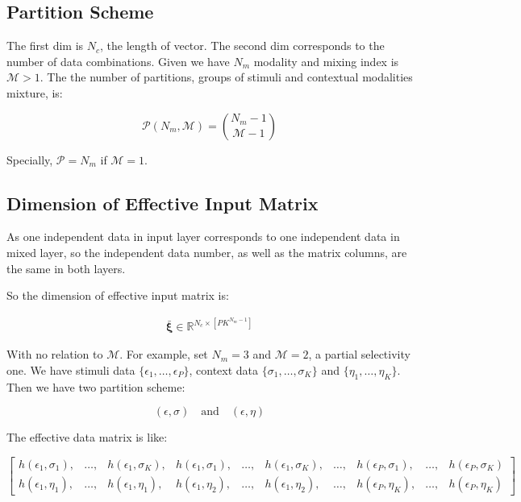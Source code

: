 \documentclass[conference]{acmsiggraph}
\begin{document}
\subsection{Partition Scheme}

The first dim is $N_c$, the length of vector. The second dim corresponds to the number of data combinations. Given we have $N_m$ modality and mixing index is $\mathcal{M} > 1$. The the number of partitions, groups of stimuli and contextual modalities mixture, is:

\begin{equation}
    \mathcal{P}(N_m,\mathcal{M}) = {N_m-1 \choose \mathcal{M}-1}
\end{equation}

Specially, $\mathcal{P} = N_m$ if $\mathcal{M} = 1$. 


\subsection{Dimension of Effective Input Matrix}

As one independent data in input layer corresponds to one independent data in mixed layer, so the independent data number, as well as the matrix columns, are the same in both layers. 

So the dimension of effective input matrix is:

\begin{align}
    \bar{\mathbf{\xi}} \in \mathbb{R}^{{N_c} \times [PK^{N_m - 1}]}
\end{align}

With no relation to $\mathcal{M}$. For example, set $N_m = 3$ and $\mathcal{M} = 2$, a partial selectivity one. We have stimuli data $\{\epsilon_1,\dots,\epsilon_P\}$, context data $\{\sigma_1,\dots,\sigma_K\}$ and $\{\eta_1,\dots,\eta_K\}$. Then we have two partition scheme:

\begin{equation*}
    (\epsilon,\sigma) \quad \text{and} \quad (\epsilon,\eta)
\end{equation*}

The effective data matrix is like:

\begin{equation}
\begin{bmatrix}
h(\epsilon_1,\sigma_1), & \dots, & h(\epsilon_1,\sigma_K), & h(\epsilon_1,\sigma_1), & \dots, & h(\epsilon_1,\sigma_K), & \dots, & h(\epsilon_P,\sigma_1), & \dots, & h(\epsilon_P,\sigma_K) \\
h(\epsilon_1,\eta_1), & \dots, & h(\epsilon_1,\eta_1), & h(\epsilon_1,\eta_2), & \dots, & h(\epsilon_1,\eta_2), & \dots, & h(\epsilon_P,\eta_K), & \dots, & h(\epsilon_P,\eta_K)
\end{bmatrix}
\end{equation}
\end{document}
